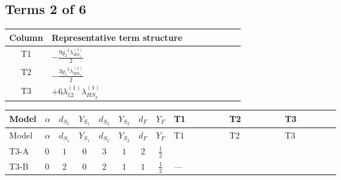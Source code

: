 \documentclass[8pt]{article}
\begin{document}
\begin{landscape}
\subsection*{Terms 2 of 6}
\begin{center}
\begin{tabular}{@{}c >{\raggedright\arraybackslash}p{0.82\linewidth}@{}}
\toprule
Column & Representative term structure \\
\midrule
T1 & \(\displaystyle -\frac{9 {g_2}^2 {\lambda_{HS_1}^{(1)}}}{2}\) \\
\midrule
T2 & \(\displaystyle -\frac{3 {g_1}^2 {\lambda_{HS_1}^{(1)}}}{2}\) \\
\midrule
T3 & \(\displaystyle +6 {\lambda_{12}^{(1)}} {\lambda_{HS_2}^{(1)}}\) \\
\midrule
\bottomrule
\end{tabular}
\end{center}
\smallskip
\tiny
\begin{longtable}{@{}llcccccc >{\raggedright\arraybackslash}p{0.21\linewidth} >{\raggedright\arraybackslash}p{0.21\linewidth} >{\raggedright\arraybackslash}p{0.21\linewidth}@{}}
\toprule
Model & $\alpha$ & $d_{S_1}$ & $Y_{S_1}$ & $d_{S_2}$ & $Y_{S_2}$ & $d_F$ & $Y_F$ & T1 & T2 & T3 \\
\midrule
\endfirsthead
\toprule
Model & $\alpha$ & $d_{S_1}$ & $Y_{S_1}$ & $d_{S_2}$ & $Y_{S_2}$ & $d_F$ & $Y_F$ & T1 & T2 & T3 \\
\midrule
\endhead
T3-A & $0$ & $1$ & $0$ & $3$ & $1$ & $2$ & $\frac{1}{2}$ & \scriptsize\adjustbox{max width=\linewidth}{$\begin{gathered} -\frac{9 {g_2}^2 {\lambda_{HS_1}^{(1)}}}{2}\end{gathered}$} & \scriptsize\adjustbox{max width=\linewidth}{$\begin{gathered} -\frac{3 {g_1}^2 {\lambda_{HS_1}^{(1)}}}{2}\end{gathered}$} & \scriptsize\adjustbox{max width=\linewidth}{$\begin{gathered} +6 {\lambda_{12}^{(1)}} {\lambda_{HS_2}^{(1)}}\end{gathered}$} \\
\midrule
T3-B & $0$ & $2$ & $0$ & $2$ & $1$ & $1$ & $\frac{1}{2}$ & --- & \scriptsize\adjustbox{max width=\linewidth}{$\begin{gathered} -\frac{3 {g_1}^2 {\lambda_{HS_1}^{(1)}}}{2}\end{gathered}$} & \scriptsize\adjustbox{max width=\linewidth}{$\begin{gathered} +4 {\lambda_{12}^{(1)}} {\lambda_{HS_2}^{(1)}}\end{gathered}$} \\

\end{longtable}
\end{landscape}
\end{document}
